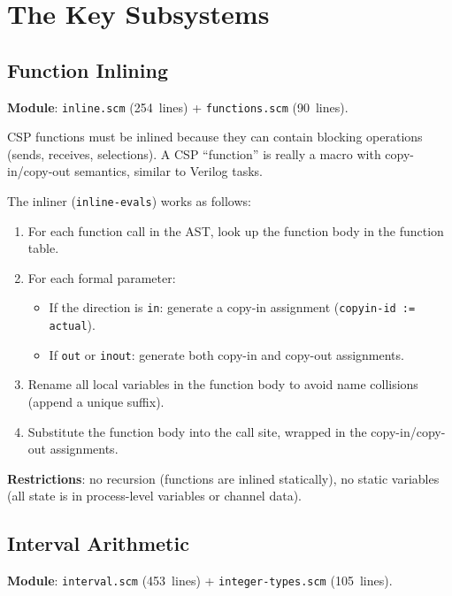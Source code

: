 \documentclass[11pt,letterpaper]{article}
\begin{document}
\section{The Key Subsystems}
\label{sec:subsystems}

\subsection{Function Inlining}
\label{sec:inline}

\textbf{Module}: \texttt{inline.scm} (254~lines) + \texttt{functions.scm}
(90~lines).

CSP functions must be inlined because they can contain blocking
operations (sends, receives, selections).  A CSP ``function'' is
really a macro with copy-in/copy-out semantics, similar to Verilog
tasks.

The inliner (\texttt{inline-evals}) works as follows:

\begin{enumerate}[nosep]
  \item For each function call in the AST, look up the function body
    in the function table.
  \item For each formal parameter:
    \begin{itemize}[nosep]
      \item If the direction is \texttt{in}: generate a copy-in
        assignment (\texttt{copyin-id := actual}).
      \item If \texttt{out} or \texttt{inout}: generate both copy-in
        and copy-out assignments.
    \end{itemize}
  \item Rename all local variables in the function body to avoid
    name collisions (append a unique suffix).
  \item Substitute the function body into the call site, wrapped
    in the copy-in/copy-out assignments.
\end{enumerate}

\textbf{Restrictions}: no recursion (functions are inlined
statically), no static variables (all state is in process-level
variables or channel data).

\subsection{Interval Arithmetic}
\label{sec:interval}

\textbf{Module}: \texttt{interval.scm} (453~lines) +
\texttt{integer-types.scm} (105~lines).
\end{document}

